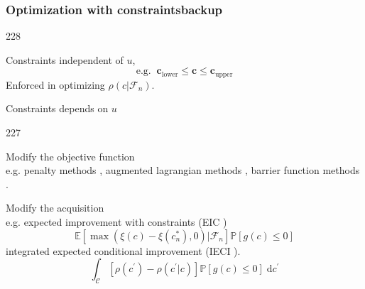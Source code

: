 \documentclass{beamer}
\let\oldcite=\cite
\renewcommand{\cite}[1]{\textcolor[rgb]{.4,.4,.85}{\oldcite{#1}}}
\newcommand{\barrow}{\item[\color{darkred}\ding{228}]}
\newcommand{\carrow}{\item[\color{darkred}\ding{227}]}
\begin{document}
\begin{frame}
    \frametitle{Optimization with constraints\hfill \scriptsize{backup}}\small
    \begin{dinglist}{228}
        \barrow Constraints independent of $u$,
                $$
                    \textrm{e.g.} \;\;
                    \boldsymbol{c}_{\textrm{lower}}\le \boldsymbol{c}\le \boldsymbol{c}_{\textrm{upper}}
                $$
                Enforced in optimizing $\rho(c\big|\mathcal{F}_n)$.
        \barrow Constraints depends on $u$
                \begin{dinglist}{227}
                    \carrow Modify the objective function\\
                    e.g. penalty methods\scriptsize\cite{Homaifar 94} \small,
                    augmented lagrangian methods 
                    \scriptsize\cite{Conn 91}\small, barrier function methods 
                    \scriptsize\cite{Conn 97}\small .
                    \vspace{.15cm}
                    \carrow Modify the acquisition\\
                    e.g. expected improvement with constraints (EIC \scriptsize\cite{Gardner 14} 
                    \small)
                    $$
                        \mathbb{E}\left[\max(\xi(c) - \xi(c^*_n),0)\big|\mathcal{F}_n\right]
                        \mathbb{P}\left[g(c)\le 0\right]
                    $$
                    integrated expected conditional improvement (IECI \scriptsize \cite{Gramacy 11}
                    \small ).
                    $$
                        \int_\mathcal{C} \left[\rho\left(c^\prime\right) 
                        -\rho\left(c^\prime\big| c\right)\right]
                        \mathbb{P}[g(c) \le 0] \;\textrm{d} c^\prime
                    $$
                \end{dinglist}
    \end{dinglist}
\end{frame}

\end{document}
